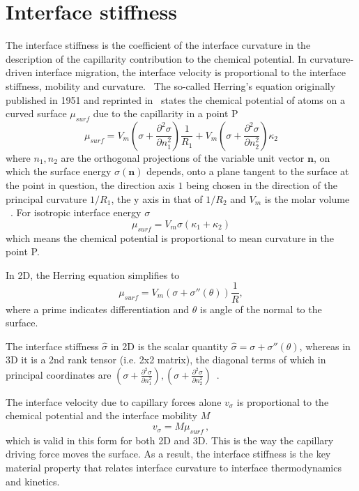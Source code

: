 \section{Interface stiffness}
The interface stiﬀness is the coeﬃcient of the interface curvature in the description of the capillarity contribution to the chemical potential. In curvature-driven interface migration, the interface velocity is proportional to the interface stiﬀness, mobility and curvature.~\cite{Du2007} The so-called Herring's equation originally published in 1951 and reprinted in~\cite{Herring1999} states the chemical potential of atoms on a curved surface $\mu_{surf}$ due to the capillarity in a point P
\begin{equation}
	\mu_{surf} = V_m\left(\sigma + \frac{\partial^2 \sigma}{\partial n_1^2} \right)\frac{1}{R_1} + V_m\left( \sigma +\frac{\partial^2 \sigma}{\partial n_2^2}\right)\kappa_2
\end{equation}
where $n_1, n_2$ are the orthogonal projections of the variable unit vector $\bm{n}$, on which the surface energy $\sigma(\bm{n})$ depends, onto a plane tangent to the surface at the point in question, the direction axis $1$ being chosen in the direction of the principal curvature $1/R_1$, the y axis in that of $1/R_2$ and $V_m$ is the molar volume ~\cite{Herring1999}. For isotropic interface energy $\sigma$
\begin{equation}
	\mu_{surf} = V_m\sigma(\kappa_1+\kappa_2)
\end{equation}
which means the chemical potential is proportional to mean curvature in the point P.

In 2D, the Herring equation simplifies to 
\begin{equation}
	\mu_{surf} = V_m(\sigma + \sigma''(\theta))\frac{1}{R},
\end{equation}
where a prime indicates differentiation and $\theta$ is angle of the normal to the surface.

The interface stiffness $\hat{\sigma}$ in 2D is the scalar quantity $\hat{\sigma} = \sigma + \sigma''(\theta)$, whereas in 3D it is a 2nd rank tensor (i.e. 2x2 matrix), the diagonal terms of which in principal coordinates are $\left(\sigma + \frac{\partial^2 \sigma}{\partial n_1^2} \right), \left( \sigma +\frac{\partial^2 \sigma}{\partial n_2^2}\right)$~\cite{Trautt2005, Du2007, Abdeljawad2018, Moore2021}.
 
The interface velocity due to capillary forces alone $v_\sigma$ is proportional to the chemical potential and the interface mobility $M$~\cite{Herring1999, Trautt2005, Du2007, Abdeljawad2018, Moore2021}
\begin{equation}
	v_\sigma = M\mu_{surf} \,,
\end{equation}
which is valid in this form for both 2D and 3D. This is the way the capillary driving force moves the surface. As a result, the interface stiﬀness is the key material property that relates interface curvature to interface thermodynamics and kinetics.~\cite{Du2007}

